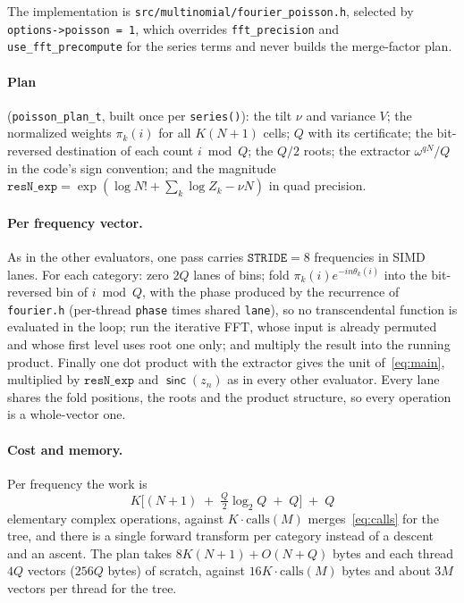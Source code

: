 \documentclass[11pt]{article}
\newcommand{\sinck}{\operatorname{\mathsf{sinc}}}
\begin{document}
The implementation is \texttt{src/multinomial/fourier\_poisson.h}, selected by
\texttt{options->poisson = 1}, which overrides \texttt{fft\_precision} and
\texttt{use\_fft\_precompute} for the series terms and never builds the merge-factor plan.

\paragraph{Plan} (\texttt{poisson\_plan\_t}, built once per \texttt{series()}): the tilt $\nu$ and
variance $V$; the normalized weights $\pi_k(i)$ for all $K(N+1)$ cells; $Q$ with its certificate; the
bit-reversed destination of each count $i\bmod Q$; the $Q/2$ roots; the extractor
$\omega^{qN}/Q$ in the code's sign convention; and the magnitude
$\texttt{resN\_exp}=\exp(\log N!+\sum_k\log Z_k-\nu N)$ in quad precision.

\paragraph{Per frequency vector.} As in the other evaluators, one pass carries $\mathtt{STRIDE}=8$
frequencies in SIMD lanes. For each category: zero $2Q$ lanes of bins; fold
$\pi_k(i)e^{-in\theta_k(i)}$ into the bit-reversed bin of $i\bmod Q$, with the phase produced by the
recurrence of \texttt{fourier.h} (per-thread \texttt{phase} times shared \texttt{lane}), so no
transcendental function is evaluated in the loop; run the iterative FFT, whose input is already
permuted and whose first level uses root one only; and multiply the result into the running product.
Finally one dot product with the extractor gives the unit of~\eqref{eq:main}, multiplied by
$\texttt{resN\_exp}$ and $\sinck(z_n)$ as in every other evaluator. Every lane shares the fold
positions, the roots and the product structure, so every operation is a whole-vector one.

\paragraph{Cost and memory.} Per frequency the work is
\[
  K\Big[(N+1)\;+\;\tfrac{Q}{2}\log_2Q\;+\;Q\Big]\;+\;Q
\]
elementary complex operations, against $K\cdot\mathrm{calls}(M)$ merges~\eqref{eq:calls} for the
tree, and there is a single forward transform per category instead of a descent and an ascent.
The plan takes $8K(N+1)+O(N+Q)$ bytes and each thread $4Q$ vectors ($256Q$ bytes) of scratch, against
$16K\cdot\mathrm{calls}(M)$ bytes and about $3M$ vectors per thread for the tree.
\end{document}
